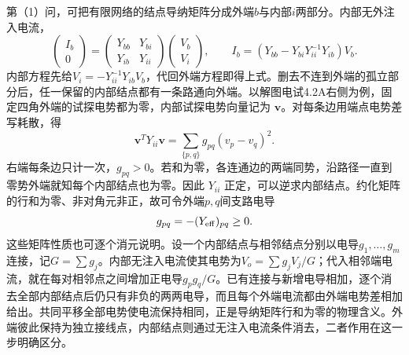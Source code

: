 \documentclass[UTF8,fontset=fandol,a4paper,11pt]{ctexart}
\begin{document}
第（1）问，可把有限网络的结点导纳矩阵分成外端$b$与内部$i$两部分。内部无外注入电流，
\[
\begin{pmatrix}I_b\\0\end{pmatrix}
=\begin{pmatrix}Y_{bb}&Y_{bi}\\Y_{ib}&Y_{ii}\end{pmatrix}
\begin{pmatrix}V_b\\V_i\end{pmatrix},
\qquad
I_b=(Y_{bb}-Y_{bi}Y_{ii}^{-1}Y_{ib})V_b.
\]
内部方程先给$V_i=-Y_{ii}^{-1}Y_{ib}V_b$，代回外端方程即得上式。删去不连到外端的孤立部分后，任一保留的内部结点都有一条路通向外端。以解图电试4.2A右侧为例，固定四角外端的试探电势都为零，内部试探电势向量记为 $\boldsymbol v$。对每条边用端点电势差写耗散，得
\[
\boldsymbol v^{T}Y_{ii}\boldsymbol v
=\sum_{\{p,q\}} g_{pq}(v_p-v_q)^2 .
\]
右端每条边只计一次，$g_{pq}>0$。若和为零，各连通边的两端同势，沿路径一直到零势外端就知每个内部结点也为零。因此 $Y_{ii}$ 正定，可以逆求内部结点。约化矩阵的行和为零、非对角元非正，故可令外端$p,q$间支路电导
\[
g_{pq}=-(Y_{\rm eff})_{pq}\ge0.
\]
这些矩阵性质也可逐个消元说明。设一个内部结点与相邻结点分别以电导$g_1,\ldots,g_m$连接，记$G=\sum g_j$。内部无注入电流使其电势为$V_o=\sum g_jV_j/G$；代入相邻端电流，就在每对相邻点之间增加正电导$g_pg_q/G$。已有连接与新增电导相加，逐个消去全部内部结点后仍只有非负的两两电导，而且每个外端电流都由外端电势差相加给出。共同平移全部电势使电流保持相同，正是导纳矩阵行和为零的物理含义。外端彼此保持为独立接线点，内部结点则通过无注入电流条件消去，二者作用在这一步明确区分。
\end{document}
